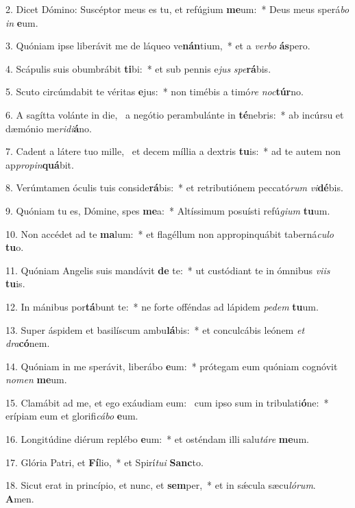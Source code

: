2. Dicet Dómino: Suscéptor meus es tu, et refúgium \textbf{me}um:~*  Deus meus sperá\textit{bo} \textit{in} \textbf{e}um.\

3. Quóniam ipse liberávit me de láqueo ve\textbf{nán}tium,~*  et a \textit{ver}\textit{bo} \textbf{ás}pero.\

4. Scápulis suis obumbrábit \textbf{ti}bi:~*  et sub pennis e\textit{jus} \textit{spe}\textbf{rá}bis.\

5. Scuto circúmdabit te véritas \textbf{e}jus:~*  non timébis a timó\textit{re} \textit{noc}\textbf{túr}no.\

6. A sagítta volánte in die, \dag\  a negótio perambulánte in \textbf{té}nebris:~*  ab incúrsu et dæmónio me\textit{ri}\textit{di}\textbf{á}no.\

7. Cadent a látere tuo mille, \dag\  et decem míllia a dextris \textbf{tu}is:~*  ad te autem non ap\textit{pro}\textit{pin}\textbf{quá}bit.\

8. Verúmtamen óculis tuis conside\textbf{rá}bis:~*  et retributiónem peccató\textit{rum} \textit{vi}\textbf{dé}bis.\

9. Quóniam tu es, Dómine, spes \textbf{me}a:~*  Altíssimum posuísti refú\textit{gi}\textit{um} \textbf{tu}um.\

10. Non accédet ad te \textbf{ma}lum:~*  et flagéllum non appropinquábit taberná\textit{cu}\textit{lo} \textbf{tu}o.\

11. Quóniam Angelis suis mandávit \textbf{de} te:~*  ut custódiant te in ómnibus \textit{vi}\textit{is} \textbf{tu}is.\

12. In mánibus por\textbf{tá}bunt te:~*  ne forte offéndas ad lápidem \textit{pe}\textit{dem} \textbf{tu}um.\

13. Super áspidem et basilíscum ambu\textbf{lá}bis:~*  et conculcábis leónem \textit{et} \textit{dra}\textbf{có}nem.\

14. Quóniam in me sperávit, liberábo \textbf{e}um:~*  prótegam eum quóniam cognóvit \textit{no}\textit{men} \textbf{me}um.\

15. Clamábit ad me, et ego exáudiam eum: \dag\  cum ipso sum in tribulati\textbf{ó}ne:~*  erípiam eum et glorifi\textit{cá}\textit{bo} \textbf{e}um.\

16. Longitúdine diérum replébo \textbf{e}um:~*  et osténdam illi salu\textit{tá}\textit{re} \textbf{me}um.\

17. Glória Patri, et \textbf{Fí}lio,~*  et Spirí\textit{tu}\textit{i} \textbf{Sanc}to.\

18. Sicut erat in princípio, et nunc, et \textbf{sem}per,~*  et in sǽcula sæcu\textit{ló}\textit{rum}. \textbf{A}men.\

